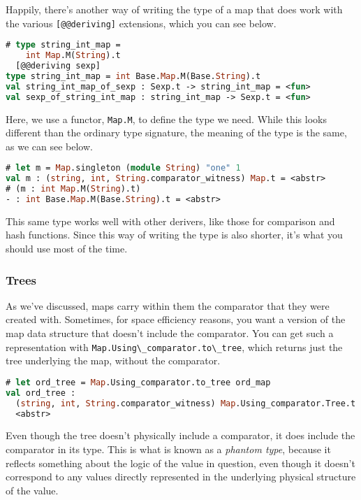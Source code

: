 Happily, there's another way of writing the type of a map that does work
with the various \passthrough{\lstinline![@@deriving]!} extensions,
which you can see below.

\begin{lstlisting}[language=Caml]
# type string_int_map =
    int Map.M(String).t
  [@@deriving sexp]
type string_int_map = int Base.Map.M(Base.String).t
val string_int_map_of_sexp : Sexp.t -> string_int_map = <fun>
val sexp_of_string_int_map : string_int_map -> Sexp.t = <fun>
\end{lstlisting}

Here, we use a functor, \passthrough{\lstinline!Map.M!}, to define the
type we need. While this looks different than the ordinary type
signature, the meaning of the type is the same, as we can see below.

\begin{lstlisting}[language=Caml]
# let m = Map.singleton (module String) "one" 1
val m : (string, int, String.comparator_witness) Map.t = <abstr>
# (m : int Map.M(String).t)
- : int Base.Map.M(Base.String).t = <abstr>
\end{lstlisting}

This same type works well with other derivers, like those for comparison
and hash functions. Since this way of writing the type is also shorter,
it's what you should use most of the time.

\hypertarget{trees}{%
\subsubsection{Trees}\label{trees}}

As we've discussed, maps carry within them the comparator that they were
created with. Sometimes, for space efficiency reasons, you want a
version of the map data structure that doesn't include the comparator.
You can get such a representation with
\passthrough{\lstinline!Map.Using\_comparator.to\_tree!}, which returns
just the tree underlying the map, without the comparator. 

\begin{lstlisting}[language=Caml]
# let ord_tree = Map.Using_comparator.to_tree ord_map
val ord_tree :
  (string, int, String.comparator_witness) Map.Using_comparator.Tree.t =
  <abstr>
\end{lstlisting}

Even though the tree doesn't physically include a comparator, it does
include the comparator in its type. This is what is known as a
\emph{phantom type}, because it reflects something about the logic of
the value in question, even though it doesn't correspond to any values
directly represented in the underlying physical structure of the value.

